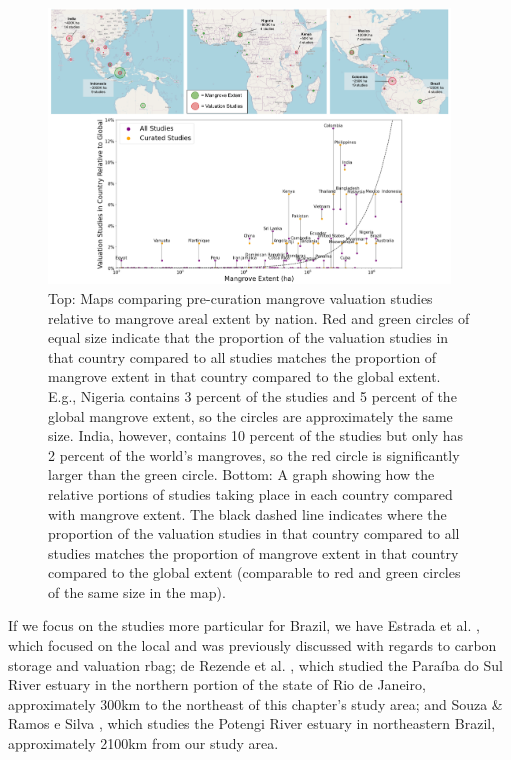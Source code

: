 \begin{figure}[!htb] 
\centering
\includegraphics[width=0.95\textwidth]{Figures/chap4/mangrove_area_studies_graphic_combo.png}
\caption[Mangrove Valuation Studies Compared to Mangrove Extent]{Top: Maps comparing pre-curation mangrove valuation studies relative to mangrove areal extent by nation. Red and green circles of equal size indicate that the proportion of the valuation studies in that country compared to all studies matches the proportion of mangrove extent in that country compared to the global extent. E.g., Nigeria contains 3 percent of the studies and 5 percent of the global mangrove extent, so the circles are approximately the same size. India, however, contains 10 percent of the studies but only has 2 percent of the world’s mangroves, so the red circle is significantly larger than the green circle.
Bottom: A graph showing how the relative portions of studies taking place in each country compared with mangrove extent. The black dashed line indicates where the proportion of the valuation studies in that country compared to all studies matches the proportion of mangrove extent in that country compared to the global extent (comparable to red and green circles of the same size in the map).}
\label{fig:mangrove_area_studies}
\end{figure}

If we focus on the studies more particular for Brazil, we have Estrada et al. \cite{estradaEconomicEvaluationCarbon2015}, which focused on the local and was previously discussed with regards to carbon storage and valuation \ac{rbag}; de Rezende et al. \cite{derezendeEconomicValuationMangrove2015}, which studied the Paraíba do Sul River estuary in the northern portion of the state of Rio de Janeiro, approximately 300km to the northeast of this chapter's study area; and Souza \& Ramos e Silva \cite{souzaEcologicalEconomicValuation2011}, which studies the Potengi River estuary in northeastern Brazil, approximately 2100km from our study area.

